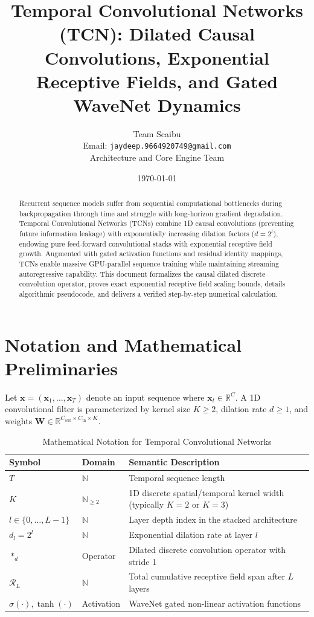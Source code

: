 \documentclass[11pt,a4paper]{article}
\title{Temporal Convolutional Networks (TCN): Dilated Causal Convolutions, Exponential Receptive Fields, and Gated WaveNet Dynamics}
\author{Team Scaibu \\ \small Email: \texttt{jaydeep.9664920749@gmail.com} \\ \small Architecture and Core Engine Team}
\date{\today}
\theoremstyle{definition}
\begin{document}
\maketitle

\begin{abstract}
Recurrent sequence models suffer from sequential computational bottlenecks during backpropagation through time and struggle with long-horizon gradient degradation. Temporal Convolutional Networks (TCNs) combine 1D causal convolutions (preventing future information leakage) with exponentially increasing dilation factors ($d = 2^l$), endowing pure feed-forward convolutional stacks with exponential receptive field growth. Augmented with gated activation functions and residual identity mappings, TCNs enable massive GPU-parallel sequence training while maintaining streaming autoregressive capability. This document formalizes the causal dilated discrete convolution operator, proves exact exponential receptive field scaling bounds, details algorithmic pseudocode, and delivers a verified step-by-step numerical calculation.
\end{abstract}

\section{Notation and Mathematical Preliminaries}

Let $\mathbf{x} = (\mathbf{x}_1, \dots, \mathbf{x}_T)$ denote an input sequence where $\mathbf{x}_t \in \mathbb{R}^C$. A 1D convolutional filter is parameterized by kernel size $K \ge 2$, dilation rate $d \ge 1$, and weights $\mathbf{W} \in \mathbb{R}^{C_{\text{out}} \times C_{\text{in}} \times K}$.

\begin{table}[h]
\centering
\caption{Mathematical Notation for Temporal Convolutional Networks}
\begin{tabular}{lll}
\toprule
\textbf{Symbol} & \textbf{Domain} & \textbf{Semantic Description} \\
\midrule
$T$ & $\mathbb{N}$ & Temporal sequence length \\
$K$ & $\mathbb{N}_{\ge 2}$ & 1D discrete spatial/temporal kernel width (typically $K=2$ or $K=3$) \\
$l \in \{0, \dots, L-1\}$ & $\mathbb{N}$ & Layer depth index in the stacked architecture \\
$d_l = 2^l$ & $\mathbb{N}$ & Exponential dilation rate at layer $l$ \\
$*_{d}$ & Operator & Dilated discrete convolution operator with stride 1 \\
$\mathcal{R}_L$ & $\mathbb{N}$ & Total cumulative receptive field span after $L$ layers \\
$\sigma(\cdot), \tanh(\cdot)$ & Activation & WaveNet gated non-linear activation functions \\
\bottomrule
\end{tabular}
\end{table}
\end{document}
